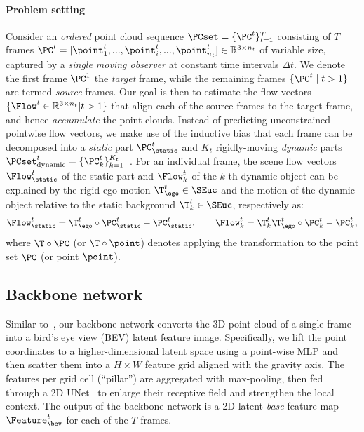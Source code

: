 \paragraph{Problem setting}
Consider an \textit{ordered} point cloud sequence $\PCset = \{\PC^t\}_{t=1}^T$ consisting of $T$ frames $\PC^t = [\point_1^t,...,\point_i^t,...,\point_{n_t}^t] \in \mathbb{R}^{3 \times n_t}$ of variable size, captured by a \textit{single moving observer} at constant time intervals $\Delta t$. We denote the first frame $\PC^1$ the \textit{target} frame, while the remaining frames $\{ \PC^{t} \; | \; t>1 \}$ are termed \textit{source} frames. Our goal is then to estimate the flow vectors $\{ \Flow^t \in \mathbb{R}^{3 \times n_t} | t>1 \}$ that align each of the source frames to the target frame, and hence \emph{accumulate} the point clouds. Instead of predicting unconstrained pointwise flow vectors, we make use of the inductive bias that each frame can be decomposed into a %
\textit{static} part $\PC^t_\static$ and $K_{t}$ rigidly-moving \textit{dynamic} parts $\PCset^t_{\text{dynamic}} = \{\PC^t_k\}_{k=1}^{K_t}$~\cite{gojcic2021weakly}. 
For an individual frame, the scene flow vectors $\Flow_\static^t$ of the static part and $\Flow_k^t$ of the $k$-th dynamic object can be explained by the rigid %
ego-motion
$\T_\ego^t \in \SEuc$ and the motion of the dynamic object relative to the static background $\T_k^t \in \SEuc$, respectively as:
\begin{equation}
\label{eq:sf}
    \Flow_\static^t = \T_\ego^t \circ \PC_\static^t - \PC_\static^t, \qquad
    \Flow_k^t = \T_k^t \T_\ego^t \circ \PC_k^t - \PC_k^t,
\end{equation}
where $\T\circ\PC$ (or $\T \circ \point$) denotes applying the transformation to the point set $\PC$ (or point $\point$).

\subsection{Backbone network}
\label{sec:backbone_network}
Similar to~\cite{baur2021slim,jund2021scalable,wu2020motionnet}, our backbone network converts the 3D point cloud of a single frame into a bird's eye view (BEV) 
latent feature image. Specifically, we lift the point coordinates to a higher-dimensional latent space using a point-wise MLP and then scatter them into a $H\times W$ feature grid aligned with the gravity axis. The features per grid cell (``pillar'') are aggregated with max-pooling, then fed through a 2D UNet~\cite{long2015fully} to enlarge their receptive field and strengthen the local context. The output of the backbone network is a 2D latent \emph{base} feature map $\Feature_\bev^t$ for each of the $T$ frames.

